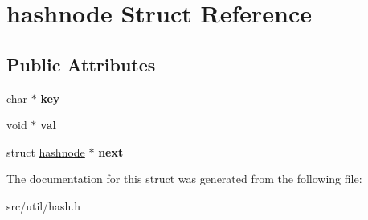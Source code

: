 \hypertarget{structhashnode}{}\section{hashnode Struct Reference}
\label{structhashnode}
\subsection*{Public Attributes}
\begin{DoxyCompactItemize}
\item 
\mbox{\label{structhashnode_a96604523eefa545e20f706652f7b27ee}} 
char $\ast$ {\bfseries key}
\item 
\mbox{\label{structhashnode_aeeb288de3af1e422ea5c897f59cac8f2}} 
void $\ast$ {\bfseries val}
\item 
\mbox{\label{structhashnode_a5da30b694097f9b33085916bfef95067}} 
struct \mbox{\hyperlink{structhashnode}{hashnode}} $\ast$ {\bfseries next}
\end{DoxyCompactItemize}


The documentation for this struct was generated from the following file\+:\begin{DoxyCompactItemize}
\item 
src/util/hash.\+h\end{DoxyCompactItemize}
